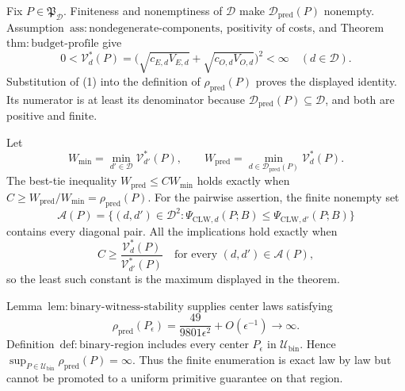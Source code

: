 Fix \(P\in\mathfrak P_{\mathcal D}\).  Finiteness and nonemptiness of \(\mathcal D\) make \(\mathcal D_{\mathrm{pred}}(P)\) nonempty.  Assumption~\(\mathrm{ass{:}nondegenerate\text{-}components}\), positivity of costs, and Theorem~\(\mathrm{thm{:}budget\text{-}profile}\) give
\[
0<\mathcal V_d^*(P)
=\bigl(\sqrt{c_{E,d}V_{E,d}}+\sqrt{c_{O,d}V_{O,d}}\bigr)^2<\infty
\quad(d\in\mathcal D).                                             \tag{1}
\]
Substitution of (1) into the definition of \(\rho_{\mathrm{pred}}(P)\) proves the displayed identity.  Its numerator is at least its denominator because \(\mathcal D_{\mathrm{pred}}(P)\subseteq\mathcal D\), and both are positive and finite.

Let
\[
W_{\min}=\min_{d'\in\mathcal D}\mathcal V_{d'}^*(P),
\qquad
W_{\mathrm{pred}}=\min_{d\in\mathcal D_{\mathrm{pred}}(P)}
\mathcal V_d^*(P).
\]
The best-tie inequality \(W_{\mathrm{pred}}\le C W_{\min}\) holds exactly when \(C\ge W_{\mathrm{pred}}/W_{\min}=\rho_{\mathrm{pred}}(P)\).  For the pairwise assertion, the finite nonempty set
\[
\mathcal A(P)=\{(d,d')\in\mathcal D^2:
\Psi_{\mathrm{CLW},d}(P;B)\le\Psi_{\mathrm{CLW},d'}(P;B)\}
\]
contains every diagonal pair.  All the implications hold exactly when
\[
C\ge\frac{\mathcal V_d^*(P)}{\mathcal V_{d'}^*(P)}
\quad\text{for every }(d,d')\in\mathcal A(P),
\]
so the least such constant is the maximum displayed in the theorem.

Lemma~\(\mathrm{lem{:}binary\text{-}witness\text{-}stability}\) supplies center laws satisfying
\[
\rho_{\mathrm{pred}}(P_\epsilon)
=\frac{49}{9801\epsilon^2}+O(\epsilon^{-1})\longrightarrow\infty.
\]
Definition~\(\mathrm{def{:}binary\text{-}region}\) includes every center \(P_\epsilon\) in \(\mathcal U_{\mathrm{bin}}\).  Hence
\(\sup_{P\in\mathcal U_{\mathrm{bin}}}\rho_{\mathrm{pred}}(P)=\infty\).  Thus the finite enumeration is exact law by law but cannot be promoted to a uniform primitive guarantee on that region.